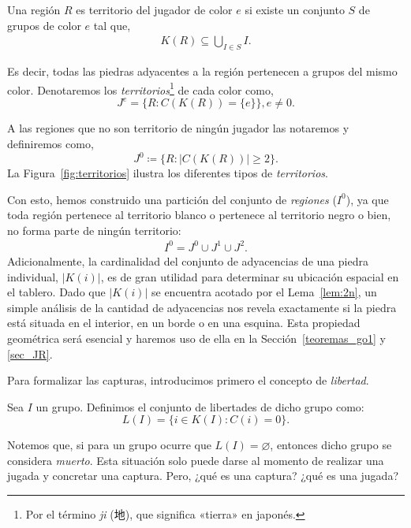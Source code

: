 \begin{definition}[Territorio]
	Una región $R$ es territorio del jugador de color $e$ si existe un conjunto $S$ de grupos de color $e$ tal que,
	\begin{align*}
		K(R) \subseteq \bigcup_{I\in S} I.
	\end{align*}
\end{definition}
Es decir, todas las piedras adyacentes a la región pertenecen a grupos del mismo color. Denotaremos los \textit{territorios}\footnote{Por el término \textit{ji} (地), que significa «tierra» en japonés.} de cada color como,
\vspace{-1em}
$$J^{e} = \{R : C(K(R)) = \{e\}\}, e\neq 0.$$

A las regiones que no son territorio de ningún jugador las notaremos y definiremos como,
\vspace{-1em}
$$J^{0}\coloneqq \{R : |C(K(R))| \geq 2\}.$$
La Figura~\ref{fig:territorios} ilustra los diferentes tipos de \textit{territorios}.


Con esto, hemos construido una partición del conjunto de \textit{regiones} ($I^{0}$), ya que toda región pertenece al territorio blanco o pertenece al territorio negro o bien, no forma parte de ningún territorio:
\begin{align*}
	I^{0} = J^{0} \cup J^{1} \cup J^{2}.
\end{align*}
\label{posicion_espacial}
Adicionalmente, la cardinalidad del conjunto de adyacencias de una piedra individual, $|K(i)|$, es de gran utilidad para determinar su ubicación espacial en el tablero. Dado que $|K(i)|$ se encuentra acotado por el Lema~\ref{lem:2n}, un simple análisis de la cantidad de adyacencias nos revela exactamente si la piedra está situada en el interior, en un borde o en una esquina. Esta propiedad geométrica será esencial y haremos uso de ella en la Sección~\ref{teoremas_go1} y \ref{sec_JR}.

Para formalizar las capturas, introducimos primero el concepto de \textit{libertad}.

\begin{definition}
	Sea $I$ un grupo. Definimos el conjunto de libertades de dicho grupo como:
	\[L(I) = \{i \in K(I) : C(i) = 0\}.\]
\end{definition}
Notemos que, si para un grupo ocurre que $L(I) = \varnothing$, entonces dicho grupo se considera \textit{muerto}. Esta situación solo puede darse al momento de realizar una jugada y concretar una captura. Pero, ¿qué es una captura? ¿qué es una jugada?


